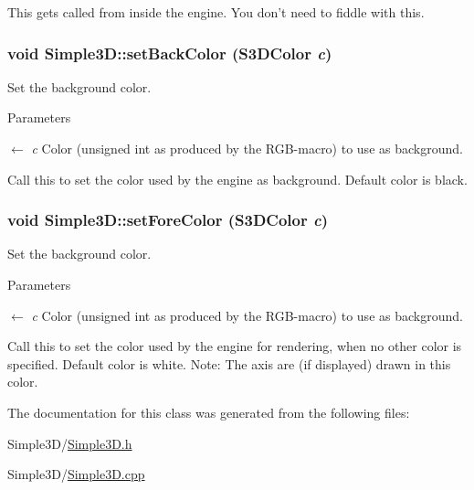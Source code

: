 This gets called from inside the engine. You don't need to fiddle with this. \hypertarget{class_simple3_d_a2e1f61afda5ab9cb2a1abd05a856c5d7}{
\subsubsection[{setBackColor}]{\setlength{\rightskip}{0pt plus 5cm}void Simple3D::setBackColor ({\bf S3DColor} {\em c})}}
\label{class_simple3_d_a2e1f61afda5ab9cb2a1abd05a856c5d7}


Set the background color. 


\begin{DoxyParams}{Parameters}
\item[\mbox{$\leftarrow$} {\em c}]Color (unsigned int as produced by the RGB-\/macro) to use as background.\end{DoxyParams}
Call this to set the color used by the engine as background. Default color is black. \hypertarget{class_simple3_d_a9dd0eb5a220c4490656dc3dd5cc79857}{
\subsubsection[{setForeColor}]{\setlength{\rightskip}{0pt plus 5cm}void Simple3D::setForeColor ({\bf S3DColor} {\em c})}}
\label{class_simple3_d_a9dd0eb5a220c4490656dc3dd5cc79857}


Set the background color. 


\begin{DoxyParams}{Parameters}
\item[\mbox{$\leftarrow$} {\em c}]Color (unsigned int as produced by the RGB-\/macro) to use as background.\end{DoxyParams}
Call this to set the color used by the engine for rendering, when no other color is specified. Default color is white. Note: The axis are (if displayed) drawn in this color. 

The documentation for this class was generated from the following files:\begin{DoxyCompactItemize}
\item 
Simple3D/\hyperlink{_simple3_d_8h}{Simple3D.h}\item 
Simple3D/\hyperlink{_simple3_d_8cpp}{Simple3D.cpp}\end{DoxyCompactItemize}
